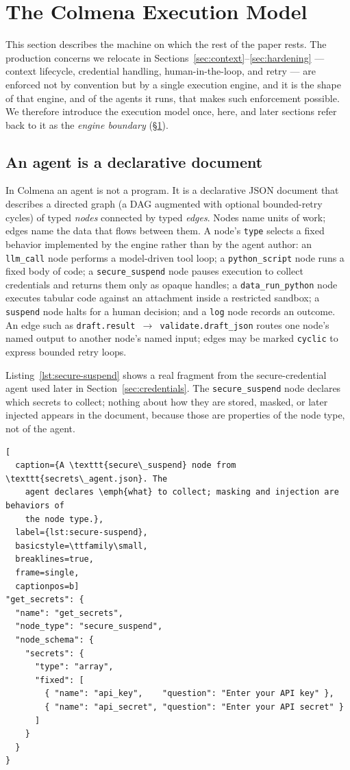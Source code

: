 \section{The Colmena Execution Model}
\label{sec:model}

This section describes the machine on which the rest of the paper rests. The
production concerns we relocate in Sections~\ref{sec:context}--\ref{sec:hardening}
--- context lifecycle, credential handling, human-in-the-loop, and retry --- are
enforced not by convention but by a single execution engine, and it is the shape
of that engine, and of the agents it runs, that makes such enforcement possible.
We therefore introduce the execution model once, here, and later sections refer
back to it as the \emph{engine boundary} (\S\ref{sec:model}).

\subsection{An agent is a declarative document}
\label{subsec:declarative}

In Colmena an agent is not a program. It is a declarative JSON document that
describes a directed graph (a DAG augmented with optional bounded-retry
cycles) of typed \emph{nodes} connected by typed \emph{edges}. Nodes name
units of work; edges name the data that flows between
them. A node's \texttt{type} selects a fixed behavior implemented by the engine
rather than by the agent author: an \texttt{llm\_call} node performs a
model-driven tool loop; a \texttt{python\_script} node runs a fixed body of code;
a \texttt{secure\_suspend} node pauses execution to collect credentials and
returns them only as opaque handles; a \texttt{data\_run\_python} node executes
tabular code against an attachment inside a restricted sandbox; a \texttt{suspend}
node halts for a human decision; and a \texttt{log} node records an outcome. An
edge such as \texttt{draft.result $\rightarrow$ validate.draft\_json} routes one
node's named output to another node's named input; edges may be marked
\texttt{cyclic} to express bounded retry loops.

Listing~\ref{lst:secure-suspend} shows a real fragment from the secure-credential
agent used later in Section~\ref{sec:credentials}. The \texttt{secure\_suspend}
node declares which secrets to collect; nothing about how they are stored,
masked, or later injected appears in the document, because those are properties
of the node type, not of the agent.

\begin{lstlisting}[
  caption={A \texttt{secure\_suspend} node from \texttt{secrets\_agent.json}. The
    agent declares \emph{what} to collect; masking and injection are behaviors of
    the node type.},
  label={lst:secure-suspend},
  basicstyle=\ttfamily\small,
  breaklines=true,
  frame=single,
  captionpos=b]
"get_secrets": {
  "name": "get_secrets",
  "node_type": "secure_suspend",
  "node_schema": {
    "secrets": {
      "type": "array",
      "fixed": [
        { "name": "api_key",    "question": "Enter your API key" },
        { "name": "api_secret", "question": "Enter your API secret" }
      ]
    }
  }
}
\end{lstlisting}

